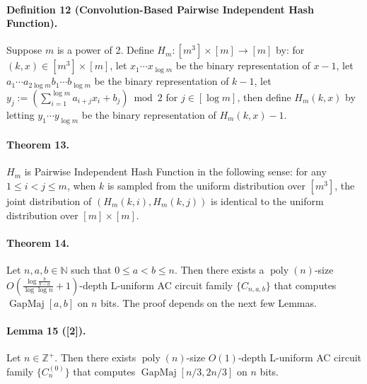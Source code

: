 \paragraph{Definition 12 (Convolution-Based Pairwise Independent Hash Function).} Suppose $m$ is a power of 2. Define $H_m:[m^3]\times[m]\to[m]$ by: for $(k,x)\in[m^3]\times[m]$, let $x_1\cdots x_{\log m}$ be the binary representation of $x-1$, let $a_1\cdots a_{2\log m}b_1\cdots b_{\log m}$ be the binary representation of $k-1$, let $y_j:=(\sum_{i=1}^{\log m}a_{i+j}x_i+b_j)\bmod2$ for $j\in[\log m]$, then define $H_m(k,x)$ by letting $y_1\cdots y_{\log m}$ be the binary representation of $H_m(k,x)-1$.
\paragraph{Theorem 13.} $H_m$ is Pairwise Independent Hash Function in the following sense: for any $1\le i<j\le m$, when $k$ is sampled from the uniform distribution over $[m^3]$, the joint distribution of $(H_m(k,i),H_m(k,j))$ is identical to the uniform distribution over $[m]\times[m]$.
\paragraph{Theorem 14.} Let $n,a,b\in\mathbb N$ such that $0\le a<b\le n$. Then there exists a $\operatorname{poly}(n)$-size $O\left(\frac{\log\frac b{b-a}}{\log\log n}+1\right)$-depth L-uniform AC circuit family $\{C_{n,a,b}\}$ that computes $\operatorname{GapMaj}[a,b]$ on $n$ bits.
The proof depends on the next few Lemmas.
\paragraph{Lemma 15 ([2]).} Let $n\in\mathbb Z^+$. Then there exists $\operatorname{poly}(n)$-size $O(1)$-depth L-uniform AC circuit family $\{C_n^{(0)}\}$ that computes $\operatorname{GapMaj}[n/3,2n/3]$ on $n$ bits.
